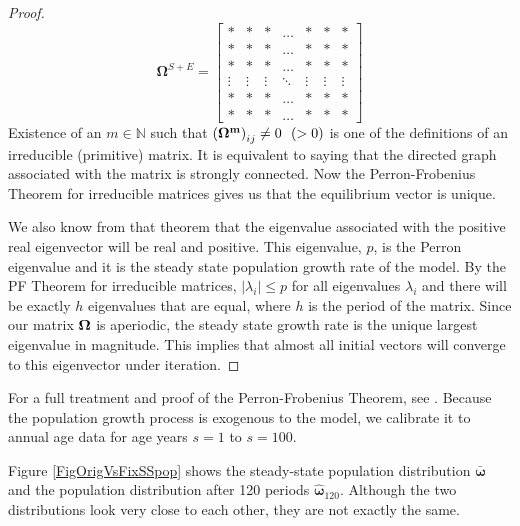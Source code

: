 \begin{proof}
$$    $$
    $$\bm{\Omega}^{S+E} =
    \begin{bmatrix}
      * & *  & * & \hdots & * & * & *\\
      * & * & * & \hdots & * & * & * \\
      * & * & * & \hdots & * & * & * \\
      \vdots & \vdots & \vdots & \ddots & \vdots & \vdots & \vdots \\
      * & * & * & \hdots & * & * & * \\
      * & * & * & \hdots & * & * & *
    \end{bmatrix}
    $$
    Existence of an $m \in \mathbb N $ such that $\left(\bf\Omega^m\right)_{ij} \neq 0 ~~ ( > 0)$ is one of the definitions of an irreducible (primitive) matrix. It is equivalent to saying that the directed graph associated with the matrix is strongly connected. Now the Perron-Frobenius Theorem for irreducible matrices gives us that the equilibrium vector is unique.

    We also know from that theorem that the eigenvalue associated with the positive real eigenvector will be real and positive. This eigenvalue, $p$, is the Perron eigenvalue and it is the steady state population growth rate of the model. By the PF Theorem for irreducible matrices, $| \lambda_i | \leq p$ for all eigenvalues $\lambda_i$ and there will be exactly $h$ eigenvalues that are equal, where $h$ is the period of the matrix. Since our matrix $\bf\Omega$ is aperiodic, the steady state growth rate is the unique largest eigenvalue in magnitude. This implies that almost all initial vectors will converge to this eigenvector under iteration.
  \end{proof}

  For a full treatment and proof of the Perron-Frobenius Theorem, see \citet{Suzumura:1983}. Because the population growth process is exogenous to the model, we calibrate it to annual age data for age years $s=1$ to $s=100$.

  Figure \ref{FigOrigVsFixSSpop} shows the steady-state population distribution $\bm{\bar{\omega}}$ and the population distribution after 120 periods $\bm{\hat{\omega}}_{120}$. Although the two distributions look very close to each other, they are not exactly the same.

